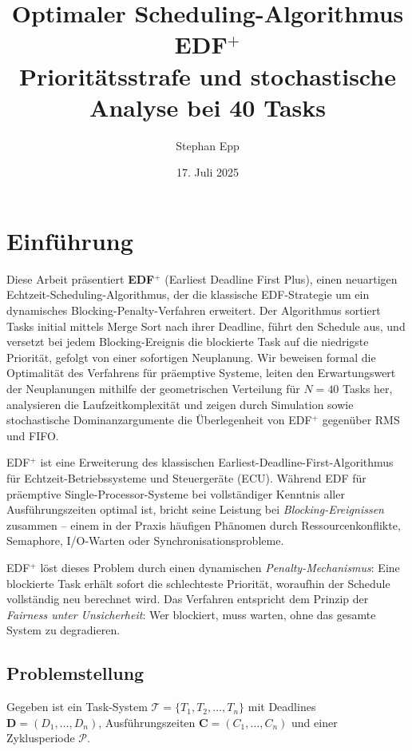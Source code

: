 ﻿\documentclass[a4paper,12pt]{article}
\title{\textbf{Optimaler Scheduling-Algorithmus EDF$^+$}\\
	Prioritätsstrafe und stochastische Analyse bei 40 Tasks}
\author{Stephan Epp}
\date{17. Juli 2025}
\theoremstyle{definition}
\begin{document}
	
	\maketitle
	
	\tableofcontents
	\newpage
	
	\section{Einführung}
	Diese Arbeit präsentiert \textbf{EDF$^+$} (Earliest Deadline First Plus), einen neuartigen Echtzeit-Schedu\-ling-Algorithmus, der die klassische EDF-Strategie um ein
	dynamisches Blocking-Penalty-Verfahren erweitert. Der Algorithmus sortiert
	Tasks initial mittels Merge Sort nach ihrer Deadline, führt den Schedule aus,
	und versetzt bei jedem Blocking-Ereignis die blockierte Task auf die niedrigste
	Priorität, gefolgt von einer sofortigen Neuplanung. Wir beweisen formal die
	Optimalität des Verfahrens für präemptive Systeme, leiten den Erwartungswert
	der Neuplanungen mithilfe der geometrischen Verteilung für $N=40$ Tasks her,
	analysieren die Laufzeitkomplexität und zeigen durch Simulation sowie
	stochastische Dominanzargumente die Überlegenheit von EDF$^+$ gegenüber
	RMS und FIFO.
	
	EDF$^+$ ist eine Erweiterung des klassischen Earliest-Deadline-First-Algorithmus
	\cite{Liu1973} für Echtzeit-Betriebssysteme und Steuergeräte (ECU). Während
	EDF für präemptive Single-Processor-Systeme bei vollständiger Kenntnis aller
	Ausführungszeiten optimal ist, bricht seine Leistung bei \emph{Blocking-Ereignissen}
	zusammen -- einem in der Praxis häufigen Phänomen durch Ressourcenkonflikte,
	Semaphore, I/O-Warten oder Synchronisationsprobleme.
	
	EDF$^+$ löst dieses Problem durch einen dynamischen \emph{Penalty-Mechanismus}:
	Eine blockierte Task erhält sofort die schlechteste Priorität, woraufhin der
	Schedule vollständig neu berechnet wird. Das Verfahren entspricht dem Prinzip
	der \emph{Fairness unter Unsicherheit}: Wer blockiert, muss warten, ohne das
	gesamte System zu degradieren.
	
	\subsection{Problemstellung}
	
	Gegeben ist ein Task-System $\mathcal{T} = \{T_1, T_2, \ldots, T_n\}$ mit
	Deadlines $\mathbf{D} = (D_1, \ldots, D_n)$, Ausführungszeiten
	$\mathbf{C} = (C_1, \ldots, C_n)$ und einer Zyklusperiode $\mathcal{P}$.
	
\end{document}

